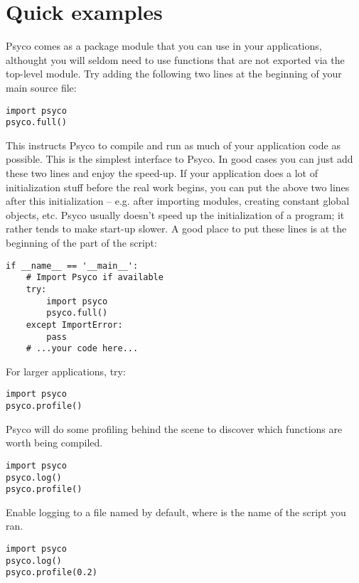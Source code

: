\documentclass{manual}
\begin{document}
\section{Quick examples}

Psyco comes as a package module that you can use in your applications, althought you will seldom need to use functions that are not exported via the top-level  module.  Try adding the following two lines at the beginning of your main  source file:

\begin{verbatim}
import psyco
psyco.full()
\end{verbatim}

This instructs Psyco to compile and run as much of your application code as possible.  This is the simplest interface to Psyco.  In good cases you can just add these two lines and enjoy the speed-up.  If your application does a lot of initialization stuff before the real work begins, you can put the above two lines after this initialization -- e.g. after importing modules, creating constant global objects, etc.  Psyco usually doesn't speed up the initialization of a program; it rather tends to make start-up slower.  A good place to put these lines is at the beginning of the  part of the script:

\begin{verbatim}
if __name__ == '__main__':
    # Import Psyco if available
    try:
        import psyco
        psyco.full()
    except ImportError:
        pass
    # ...your code here...
\end{verbatim}

For larger applications, try:

\begin{verbatim}
import psyco
psyco.profile()
\end{verbatim}

Psyco will do some profiling behind the scene to discover which functions are worth being compiled.

\begin{verbatim}
import psyco
psyco.log()
psyco.profile()
\end{verbatim}

Enable logging to a file named  by default, where  is the name of the script you ran.

\begin{verbatim}
import psyco
psyco.log()
psyco.profile(0.2)
\end{verbatim}
\end{document}
